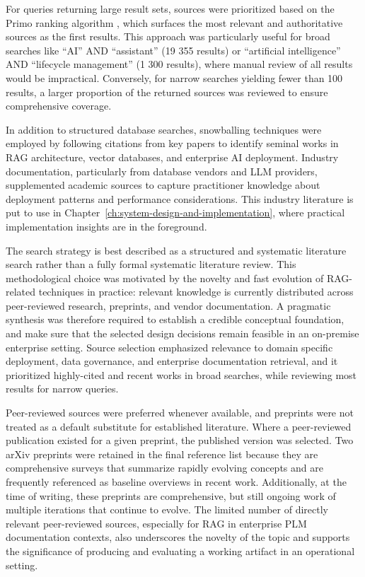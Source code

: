 For queries returning large result sets, sources were prioritized based on the Primo ranking algorithm \parencite{SearchRankingCDI2020}, which surfaces the most relevant and authoritative sources as the first results. This approach was particularly useful for broad searches like ``AI'' AND ``assistant'' (19 355 results) or ``artificial intelligence'' AND ``lifecycle management'' (1 300 results), where manual review of all results would be impractical. Conversely, for narrow searches yielding fewer than 100 results, a larger proportion of the returned sources was reviewed to ensure comprehensive coverage.

In addition to structured database searches, snowballing techniques were employed by following citations from key papers to identify seminal works in RAG architecture, vector databases, and enterprise AI deployment. Industry documentation, particularly from database vendors and LLM providers, supplemented academic sources to capture practitioner knowledge about deployment patterns and performance considerations. This industry literature is put to use in Chapter~\ref{ch:system-design-and-implementation}, where practical implementation insights are in the foreground.

The search strategy is best described as a structured and systematic literature search rather than a fully formal systematic literature review. This methodological choice was motivated by the novelty and fast evolution of RAG-related techniques in practice: relevant knowledge is currently distributed across peer-reviewed research, preprints, and vendor documentation. A pragmatic synthesis was therefore required to establish a credible conceptual foundation, and make sure that the selected design decisions remain feasible in an on-premise enterprise setting. Source selection emphasized relevance to domain specific deployment, data governance, and enterprise documentation retrieval, and it prioritized highly-cited and recent works in broad searches, while reviewing most results for narrow queries.

Peer-reviewed sources were preferred whenever available, and preprints were not treated as a default substitute for established literature. Where a peer-reviewed publication existed for a given preprint, the published version was selected. Two arXiv preprints were retained in the final reference list \parencite{gaoRetrievalAugmentedGenerationLarge2024, zhaoSurveyLargeLanguage2025} because they are comprehensive surveys that summarize rapidly evolving concepts and are frequently referenced as baseline overviews in recent work. Additionally, at the time of writing, these preprints are comprehensive, but still ongoing work of multiple iterations that continue to evolve. The limited number of directly relevant peer-reviewed sources, especially for RAG in enterprise PLM documentation contexts, also underscores the novelty of the topic and supports the significance of producing and evaluating a working artifact in an operational setting.


